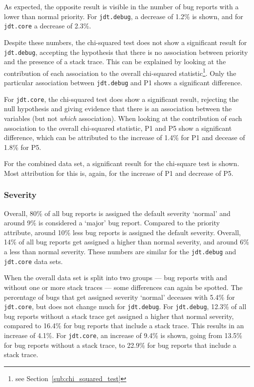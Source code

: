 As expected, the opposite result is visible in the number of bug reports with a lower than normal priority. For \texttt{jdt.debug}, a decrease of 1.2\% is shown, and for \texttt{jdt.core} a decrease of 2.3\%.

Despite these numbers, the chi-squared test does not show a significant result for \texttt{jdt.debug}, accepting the hypothesis that there is no association between priority and the presence of a stack trace. This can be explained by looking at the contribution of each association to the overall chi-squared statistic\footnote{see Section~\ref{sub:chi_squared_test}}. Only the particular association between \texttt{jdt.debug} and P1 shows a significant difference.

For \texttt{jdt.core}, the chi-squared test does show a significant result, rejecting the null hypothesis and giving evidence that there is an association between the variables (but not \emph{which} association). When looking at the contribution of each association to the overall chi-squared statistic, P1 and P5 show a significant difference, which can be attributed to the increase of 1.4\% for P1 and decease of 1.8\% for P5.

For the combined data set, a significant result for the chi-square test is shown. Most attribution for this is, again, for the increase of P1 and decrease of P5.

\subsubsection{Severity} %
Overall, 80\% of all bug reports is assigned the default severity `normal' and around 9\% is considered a `major' bug report. Compared to the priority attribute, around 10\% less bug reports is assigned the default severity. Overall, 14\% of all bug reports get assigned a higher than normal severity, and around 6\% a less than normal severity. These numbers are similar for the \texttt{jdt.debug} and \texttt{jdt.core} data sets.

When the overall data set is split into two groups --- bug reports with and without one or more stack traces --- some differences can again be spotted. The percentage of bugs that get assigned severity `normal' deceases with 5.4\% for \texttt{jdt.core}, but does not change much for \texttt{jdt.debug}. For \texttt{jdt.debug}, 12.3\% of all bug reports without a stack trace get assigned a higher that normal severity, compared to 16.4\% for bug reports that include a stack trace. This results in an increase of 4.1\%. For \texttt{jdt.core}, an increase of 9.4\% is shown, going from 13.5\% for bug reports without a stack trace, to 22.9\% for bug reports that include a stack trace. 

